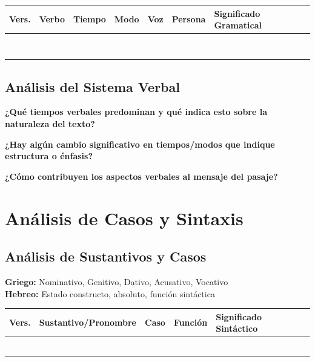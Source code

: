 \documentclass[11pt,a4paper]{article}
\begin{document}
\begin{tabularx}{\textwidth}{|c|X|c|c|c|c|X|}
\hline
\textbf{Vers.} & \textbf{Verbo} & \textbf{Tiempo} & \textbf{Modo} & \textbf{Voz} & \textbf{Persona} & \textbf{Significado Gramatical} \\
\hline
& & & & & & \\[1cm]
\hline
& & & & & & \\[1cm]
\hline
& & & & & & \\[1cm]
\hline
& & & & & & \\[1cm]
\hline
& & & & & & \\[1cm]
\hline
& & & & & & \\[1cm]
\hline
& & & & & & \\[1cm]
\hline
& & & & & & \\[1cm]
\hline
\end{tabularx}

\subsection{Análisis del Sistema Verbal}

\textbf{¿Qué tiempos verbales predominan y qué indica esto sobre la naturaleza del texto?}
\vspace{2cm}

\textbf{¿Hay algún cambio significativo en tiempos/modos que indique estructura o énfasis?}
\vspace{2cm}

\textbf{¿Cómo contribuyen los aspectos verbales al mensaje del pasaje?}
\vspace{2cm}

\section{Análisis de Casos y Sintaxis}

\subsection{Análisis de Sustantivos y Casos}

\begin{grammarbox}
\textbf{Griego:} Nominativo, Genitivo, Dativo, Acusativo, Vocativo\\
\textbf{Hebreo:} Estado constructo, absoluto, función sintáctica
\end{grammarbox}

\begin{tabularx}{\textwidth}{|c|X|c|X|X|}
\hline
\textbf{Vers.} & \textbf{Sustantivo/Pronombre} & \textbf{Caso} & \textbf{Función} & \textbf{Significado Sintáctico} \\
\hline
& & & & \\[1cm]
\hline
& & & & \\[1cm]
\hline
& & & & \\[1cm]
\hline
& & & & \\[1cm]
\hline
& & & & \\[1cm]
\hline
& & & & \\[1cm]
\hline
\end{tabularx}
\end{document}
